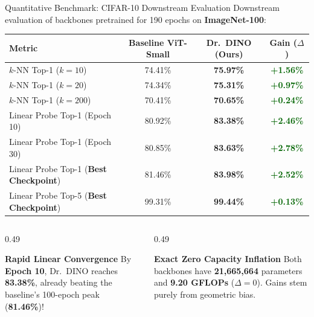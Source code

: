 \documentclass[aspectratio=169,10pt]{beamer}
\begin{document}
\begin{frame}{Quantitative Benchmark: CIFAR-10 Downstream Evaluation}
\vspace{-0.3em}
Downstream evaluation of backbones pretrained for 190 epochs on \textbf{ImageNet-100}:

\vspace{0.1em}
\centering
\small
\begin{tabular}{lccc}
\toprule
\textbf{Metric} & \textbf{Baseline ViT-Small} & \textbf{Dr.\ DINO (Ours)} & \textbf{Gain ($\Delta$)} \\
\midrule
$k$-NN Top-1 ($k=10$) & 74.41\% & \textbf{75.97\%} & \textcolor{darkgreen}{\textbf{+1.56\%}} \\
$k$-NN Top-1 ($k=20$) & 74.34\% & \textbf{75.31\%} & \textcolor{darkgreen}{\textbf{+0.97\%}} \\
$k$-NN Top-1 ($k=200$) & 70.41\% & \textbf{70.65\%} & \textcolor{darkgreen}{\textbf{+0.24\%}} \\
\midrule
Linear Probe Top-1 (Epoch 10) & 80.92\% & \textbf{83.38\%} & \textcolor{darkgreen}{\textbf{+2.46\%}} \\
Linear Probe Top-1 (Epoch 30) & 80.85\% & \textbf{83.63\%} & \textcolor{darkgreen}{\textbf{+2.78\%}} \\
Linear Probe Top-1 (\textbf{Best Checkpoint}) & 81.46\% & \textbf{83.98\%} & \textcolor{darkgreen}{\textbf{+2.52\%}} \\
Linear Probe Top-5 (\textbf{Best Checkpoint}) & 99.31\% & \textbf{99.44\%} & \textcolor{darkgreen}{\textbf{+0.13\%}} \\
\bottomrule
\end{tabular}

\vspace{0.4em}
\begin{columns}[t]
    \begin{column}{0.49\textwidth}
        \begin{block}{\textbf{Rapid Linear Convergence}}
            \small
            By \textbf{Epoch 10}, Dr.\ DINO reaches \textbf{83.38\%}, already beating the baseline's 100-epoch peak (\textbf{81.46\%})!
        \end{block}
    \end{column}

    \begin{column}{0.49\textwidth}
        \begin{exampleblock}{\textbf{Exact Zero Capacity Inflation}}
            \small
            Both backbones have \textbf{21,665,664} parameters and \textbf{9.20 GFLOPs} ($\Delta = 0$). Gains stem purely from geometric bias.
        \end{exampleblock}
    \end{column}
\end{columns}
\end{frame}
\end{document}
